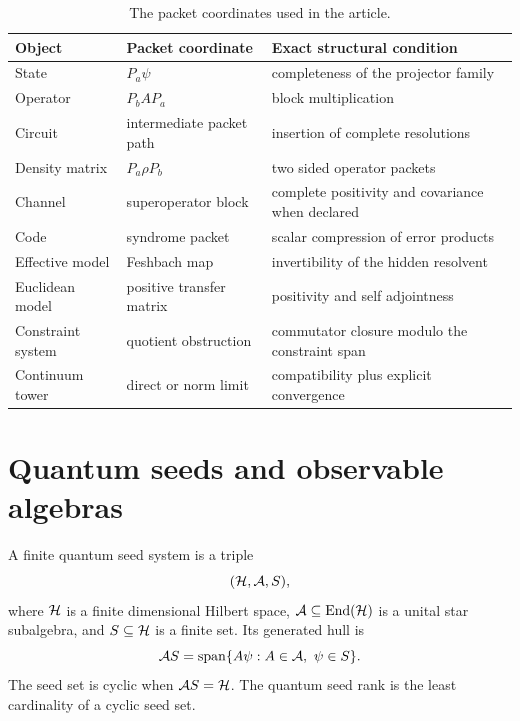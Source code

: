 \begin{table}[t]
\centering
\small
\begin{tabular}{>{\raggedright\arraybackslash}p{}>{\raggedright\arraybackslash}p{}>{\raggedright\arraybackslash}p{}}
\toprule
Object & Packet coordinate & Exact structural condition \\
\midrule
State & \(P_a\psi\) & completeness of the projector family \\
Operator & \(P_bAP_a\) & block multiplication \\
Circuit & intermediate packet path & insertion of complete resolutions \\
Density matrix & \(P_a\rho P_b\) & two sided operator packets \\
Channel & superoperator block & complete positivity and covariance when declared \\
Code & syndrome packet & scalar compression of error products \\
Effective model & Feshbach map & invertibility of the hidden resolvent \\
Euclidean model & positive transfer matrix & positivity and self adjointness \\
Constraint system & quotient obstruction & commutator closure modulo the constraint span \\
Continuum tower & direct or norm limit & compatibility plus explicit convergence \\
\bottomrule
\end{tabular}
\caption{The packet coordinates used in the article.}
\label{strong:tab:dictionary}
\end{table}

\section{Quantum seeds and observable algebras}\label{strong:section:002}\label{strong:sec:seeds}

\begin{definition}\label{strong:definition:001}\label{strong:def:quantum_seed}
A finite quantum seed system is a triple
\[
(\Hcal,\Acal,S),
\]
where \(\Hcal\) is a finite dimensional Hilbert space, \(\Acal\subseteq\End(\Hcal)\) is a unital star subalgebra, and \(S\subseteq\Hcal\) is a finite set. Its generated hull is
\[
\Acal S
=
\operatorname{span}\{A\psi:A\in\Acal,\ \psi\in S\}.
\]
The seed set is cyclic when \(\Acal S=\Hcal\). The quantum seed rank is the least cardinality of a cyclic seed set.
\end{definition}

